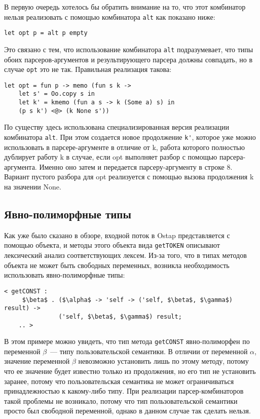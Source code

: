 \documentclass[conference]{IEEEtran}
\begin{document}
В первую очередь хотелось бы обратить внимание на то, что этот комбинатор нельзя реализовать с помощью комбинатора \lstinline|alt| как показано ниже:

\begin{lstlisting}[basicstyle=\small]
  let opt p = alt p empty
\end{lstlisting}

Это связано с тем, что использование комбинатора \lstinline|alt| подразумевает, что типы обоих парсеров-аргументов и результирующего парсера должны совпадать,
но в случае \lstinline|opt| это не так. Правильная реализация такова:

\begin{lstlisting}[basicstyle=\small]
  let opt = fun p -> memo (fun s k ->
    let s' = Oo.copy s in
    let k' = kmemo (fun a s -> k (Some a) s) in
    (p s k') <@> (k None s'))
\end{lstlisting}

По существу здесь использована специализированная версия реализации комбинатора \lstinline|alt|. При этом создается новое продолжение \lstinline|k'|, которое уже можно
использовать в парсере-аргументе в отличие от k, работа которого полностью дублирует работу k в случае, если opt выполняет разбор с помощью парсера-аргумента.
Именно оно затем и передается парсеру-аргументу в строке 8. Вариант пустого разбора для opt реализуется с помощью вызова продолжения k на значении None.

\subsection{Явно-полиморфные типы}

Как уже было сказано в обзоре, входной поток в Ostap представляется с помощью объекта, и методы этого объекта вида \lstinline|getTOKEN| описывают лексический анализ
соответствующих лексем. Из-за того, что в типах методов объекта не может быть свободных переменных, возникла необходимость использовать явно-полиморфные типы:

\begin{lstlisting}[basicstyle=\small]
  < getCONST :
     $\beta$ . ($\alpha$ -> 'self -> ('self, $\beta$, $\gamma$) result) ->
               ('self, $\beta$, $\gamma$) result;
    .. >
\end{lstlisting}

В этом примере можно увидеть, что тип метода \lstinline|getCONST| явно-полиморфен по переменной $\beta$~--- типу пользовательской семантики. В отличии от переменной $\alpha$,
значение переменной $\beta$ невозможно установить лишь по этому методу, потому что ее значение будет известно только из продолжения, но его тип не установить заранее,
потому что пользовательская семантика не может ограничиваться принадлежностью к какому-либо типу. При реализации парсер-комбинаторов такой проблемы не возникало,
потому что тип пользовательской семантики просто был свободной переменной, однако в данном случае так сделать нельзя.
\end{document}

